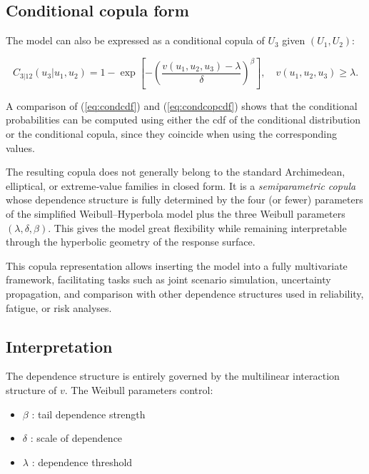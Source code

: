 \subsection{Conditional copula form}

The model can also be expressed as a conditional copula of \(U_3\) given \((U_1,U_2)\):

\begin{equation}\label{eq:condcopcdf}
\boxed{
C_{3|12}(u_3|u_1,u_2)
=
1 -
\exp\!\left[
-
\left(
\frac{
v(u_1,u_2,u_3)-\lambda
}{\delta}
\right)^\beta
\right], \quad v(u_1,u_2,u_3)\ge \lambda.
}
\end{equation}

A comparison of (\ref{eq:condcdf}) and (\ref{eq:condcopcdf}) shows that the conditional probabilities can be computed using either the cdf of the conditional distribution or the conditional copula, since they coincide when using the corresponding values.

\begin{remarkbox}
\begin{remarkT}
The resulting copula does not generally belong to the standard Archimedean, elliptical, or extreme‑value families in closed form. It is a \emph{semiparametric copula} whose dependence structure is fully determined by the four (or fewer) parameters of the simplified Weibull–Hyperbola model plus the three Weibull parameters \((\lambda, \delta, \beta)\). This gives the model great flexibility while remaining interpretable through the hyperbolic geometry of the response surface.
\end{remarkT}
\end{remarkbox}

This copula representation allows inserting the model into a fully multivariate framework, facilitating tasks such as joint scenario simulation, uncertainty propagation, and comparison with other dependence structures used in reliability, fatigue, or risk analyses.

\subsection{Interpretation}

The dependence structure is entirely governed by the multilinear interaction structure of \(v\). The Weibull parameters control:

\begin{itemize}
\item \(\beta\) : tail dependence strength
\item \(\delta\) : scale of dependence
\item \(\lambda\) : dependence threshold
\end{itemize}

